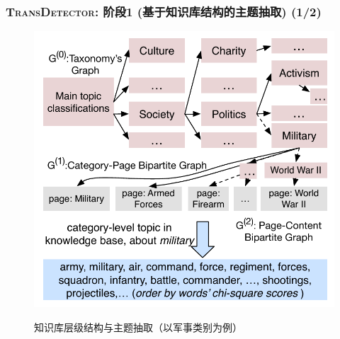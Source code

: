 \begin{frame}
\frametitle{\textsc{TransDetector}: 阶段1 (基于知识库结构的主题抽取) (1/2)}	
\vspace{-4mm}
\begin{figure}[h]
		\setlength{\abovecaptionskip}{0.cm}
        \setlength{\belowcaptionskip}{0.cm}
        \centering
		\caption{知识库层级结构与主题抽取（以军事类别为例）}
        \includegraphics[width=0.6\columnwidth]{img/initializationExample.pdf}
        \label{fig:hood}
\end{figure}
\end{frame}

